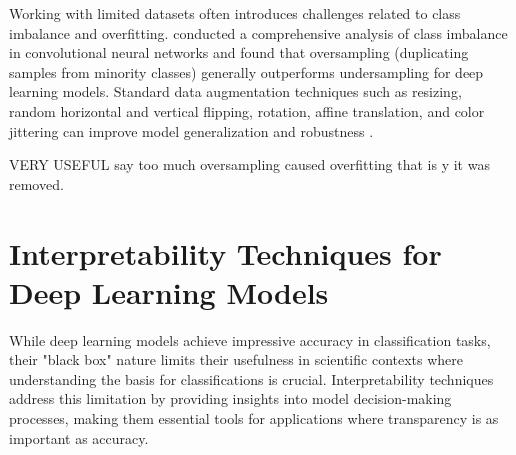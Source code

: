 \documentclass[a4paper,12pt]{report}
\begin{document}





Working with limited datasets often introduces challenges related to class imbalance and overfitting. \citep{buda2018systematic} conducted a comprehensive analysis of class imbalance in convolutional neural networks and found that oversampling (duplicating samples from minority classes) generally outperforms undersampling for deep learning models. Standard data augmentation techniques such as resizing, random horizontal and vertical flipping, rotation, affine translation, and color jittering can improve model generalization and robustness \citep{yang2022augmentation,wu2024augmentation}.

VERY USEFUL say too much oversampling caused overfitting that is y it was removed.







\section*{Interpretability Techniques for Deep Learning Models}
While deep learning models achieve impressive accuracy in classification tasks, their "black box" nature limits their usefulness in scientific contexts where understanding the basis for classifications is crucial. Interpretability techniques address this limitation by providing insights into model decision-making processes, making them essential tools for applications where transparency is as important as accuracy.
\end{document}
